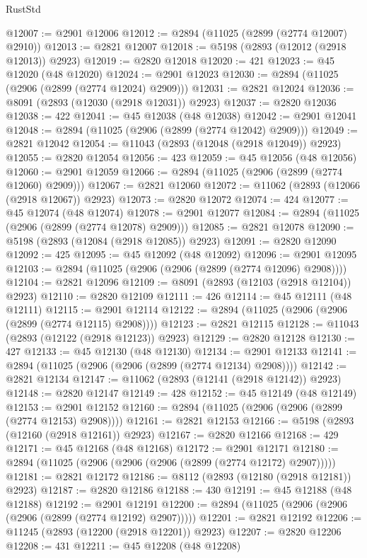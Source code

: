 \begin{lexlean}{RustStd}
\begin{coremodule}
@12007 := @2901 @12006
@12012 := @2894 (@11025 (@2899 (@2774 @12007) @2910))
@12013 := @2821 @12007
@12018 := @5198 (@2893 (@12012 (@2918 @12013)) @2923)
@12019 := @2820 @12018
@12020 := 421
@12023 := @45 @12020 (@48 @12020)
@12024 := @2901 @12023
@12030 := @2894 (@11025 (@2906 (@2899 (@2774 @12024) @2909)))
@12031 := @2821 @12024
@12036 := @8091 (@2893 (@12030 (@2918 @12031)) @2923)
@12037 := @2820 @12036
@12038 := 422
@12041 := @45 @12038 (@48 @12038)
@12042 := @2901 @12041
@12048 := @2894 (@11025 (@2906 (@2899 (@2774 @12042) @2909)))
@12049 := @2821 @12042
@12054 := @11043 (@2893 (@12048 (@2918 @12049)) @2923)
@12055 := @2820 @12054
@12056 := 423
@12059 := @45 @12056 (@48 @12056)
@12060 := @2901 @12059
@12066 := @2894 (@11025 (@2906 (@2899 (@2774 @12060) @2909)))
@12067 := @2821 @12060
@12072 := @11062 (@2893 (@12066 (@2918 @12067)) @2923)
@12073 := @2820 @12072
@12074 := 424
@12077 := @45 @12074 (@48 @12074)
@12078 := @2901 @12077
@12084 := @2894 (@11025 (@2906 (@2899 (@2774 @12078) @2909)))
@12085 := @2821 @12078
@12090 := @5198 (@2893 (@12084 (@2918 @12085)) @2923)
@12091 := @2820 @12090
@12092 := 425
@12095 := @45 @12092 (@48 @12092)
@12096 := @2901 @12095
@12103 := @2894 (@11025 (@2906 (@2906 (@2899 (@2774 @12096) @2908))))
@12104 := @2821 @12096
@12109 := @8091 (@2893 (@12103 (@2918 @12104)) @2923)
@12110 := @2820 @12109
@12111 := 426
@12114 := @45 @12111 (@48 @12111)
@12115 := @2901 @12114
@12122 := @2894 (@11025 (@2906 (@2906 (@2899 (@2774 @12115) @2908))))
@12123 := @2821 @12115
@12128 := @11043 (@2893 (@12122 (@2918 @12123)) @2923)
@12129 := @2820 @12128
@12130 := 427
@12133 := @45 @12130 (@48 @12130)
@12134 := @2901 @12133
@12141 := @2894 (@11025 (@2906 (@2906 (@2899 (@2774 @12134) @2908))))
@12142 := @2821 @12134
@12147 := @11062 (@2893 (@12141 (@2918 @12142)) @2923)
@12148 := @2820 @12147
@12149 := 428
@12152 := @45 @12149 (@48 @12149)
@12153 := @2901 @12152
@12160 := @2894 (@11025 (@2906 (@2906 (@2899 (@2774 @12153) @2908))))
@12161 := @2821 @12153
@12166 := @5198 (@2893 (@12160 (@2918 @12161)) @2923)
@12167 := @2820 @12166
@12168 := 429
@12171 := @45 @12168 (@48 @12168)
@12172 := @2901 @12171
@12180 := @2894 (@11025 (@2906 (@2906 (@2906 (@2899 (@2774 @12172) @2907)))))
@12181 := @2821 @12172
@12186 := @8112 (@2893 (@12180 (@2918 @12181)) @2923)
@12187 := @2820 @12186
@12188 := 430
@12191 := @45 @12188 (@48 @12188)
@12192 := @2901 @12191
@12200 := @2894 (@11025 (@2906 (@2906 (@2906 (@2899 (@2774 @12192) @2907)))))
@12201 := @2821 @12192
@12206 := @11245 (@2893 (@12200 (@2918 @12201)) @2923)
@12207 := @2820 @12206
@12208 := 431
@12211 := @45 @12208 (@48 @12208)

\end{coremodule}
\end{lexlean}
